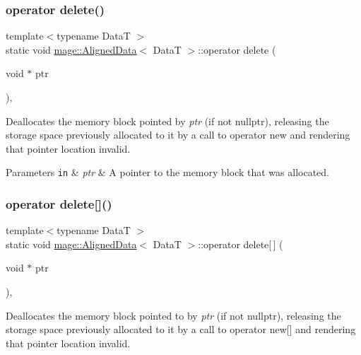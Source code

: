 \subsubsection{\texorpdfstring{operator delete()}{operator delete()}}
{\footnotesize\ttfamily template$<$typename DataT $>$ \\
static void \hyperlink{structmage_1_1_aligned_data}{mage\+::\+Aligned\+Data}$<$ DataT $>$\+::operator delete (\begin{DoxyParamCaption}\item[{void $\ast$}]{ptr }\end{DoxyParamCaption})\hspace{0.3cm}{\ttfamily [static]}, {\ttfamily [noexcept]}}

Deallocates the memory block pointed by {\itshape ptr} (if not nullptr), releasing the storage space previously allocated to it by a call to operator new and rendering that pointer location invalid.


\begin{DoxyParams}[1]{Parameters}
\mbox{\tt in}  & {\em ptr} & A pointer to the memory block that was allocated. \\
\hline
\end{DoxyParams}
\hypertarget{structmage_1_1_aligned_data_a257c2d30f4764caf48647e1f759d28b4}{}\label{structmage_1_1_aligned_data_a257c2d30f4764caf48647e1f759d28b4} 
\subsubsection{\texorpdfstring{operator delete[]()}{operator delete[]()}}
{\footnotesize\ttfamily template$<$typename DataT $>$ \\
static void \hyperlink{structmage_1_1_aligned_data}{mage\+::\+Aligned\+Data}$<$ DataT $>$\+::operator delete\mbox{[}$\,$\mbox{]} (\begin{DoxyParamCaption}\item[{void $\ast$}]{ptr }\end{DoxyParamCaption})\hspace{0.3cm}{\ttfamily [static]}, {\ttfamily [noexcept]}}

Deallocates the memory block pointed to by {\itshape ptr} (if not nullptr), releasing the storage space previously allocated to it by a call to operator new\mbox{[}\mbox{]} and rendering that pointer location invalid.


